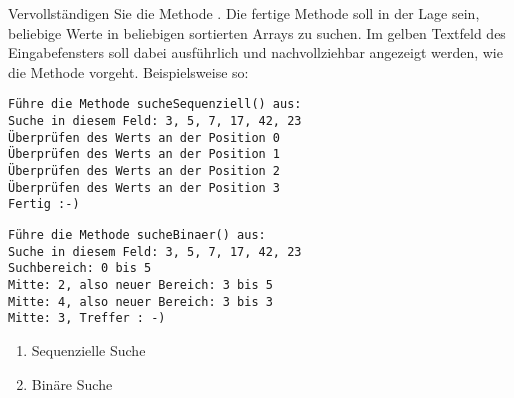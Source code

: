 \documentclass{lehramt-informatik-haupt}
\begin{document}
Vervollständigen Sie die Methode . Die fertige
Methode soll in der Lage sein, beliebige Werte in beliebigen sortierten
Arrays zu suchen. Im gelben Textfeld des Eingabefensters soll dabei
ausführlich und nachvollziehbar angezeigt werden, wie die Methode
vorgeht. Beispielsweise so:

{
\tiny
\begin{multicols}{2}
\begin{verbatim}
Führe die Methode sucheSequenziell() aus:
Suche in diesem Feld: 3, 5, 7, 17, 42, 23
Überprüfen des Werts an der Position 0
Überprüfen des Werts an der Position 1
Überprüfen des Werts an der Position 2
Überprüfen des Werts an der Position 3
Fertig :-)
\end{verbatim}

\begin{verbatim}
Führe die Methode sucheBinaer() aus:
Suche in diesem Feld: 3, 5, 7, 17, 42, 23
Suchbereich: 0 bis 5
Mitte: 2, also neuer Bereich: 3 bis 5
Mitte: 4, also neuer Bereich: 3 bis 3
Mitte: 3, Treffer : -)
\end{verbatim}
\end{multicols}
}

\begin{enumerate}
\item Sequenzielle Suche
\begin{antwort}
\end{antwort}

\item Binäre Suche

\begin{antwort}
\end{antwort}

\end{enumerate}

\literatur
\end{document}
